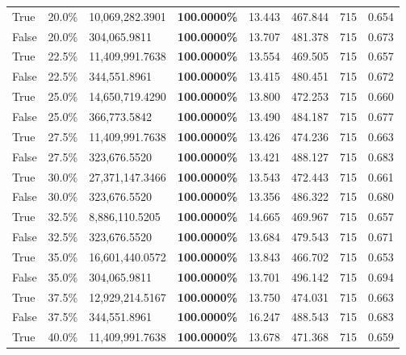 \begin{table}[H]
\begin{tabular}{lllrllll}
\cline{1-8}
True & 20.0\% & 10,069,282.3901 & \bfseries \color{red} 100.0000\% & 13.443 & 467.844 & 715 & 0.654 \\
\cline{1-8}
False & 20.0\% & \color{red} 304,065.9811 & \bfseries \color{red} 100.0000\% & 13.707 & 481.378 & 715 & 0.673 \\
\cline{1-8}
True & 22.5\% & 11,409,991.7638 & \bfseries \color{red} 100.0000\% & 13.554 & 469.505 & 715 & 0.657 \\
\cline{1-8}
False & 22.5\% & 344,551.8961 & \bfseries \color{red} 100.0000\% & 13.415 & 480.451 & 715 & 0.672 \\
\cline{1-8}
True & 25.0\% & 14,650,719.4290 & \bfseries \color{red} 100.0000\% & 13.800 & 472.253 & 715 & 0.660 \\
\cline{1-8}
False & 25.0\% & 366,773.5842 & \bfseries \color{red} 100.0000\% & 13.490 & 484.187 & 715 & 0.677 \\
\cline{1-8}
True & 27.5\% & 11,409,991.7638 & \bfseries \color{red} 100.0000\% & 13.426 & 474.236 & 715 & 0.663 \\
\cline{1-8}
False & 27.5\% & 323,676.5520 & \bfseries \color{red} 100.0000\% & 13.421 & 488.127 & 715 & 0.683 \\
\cline{1-8}
True & 30.0\% & 27,371,147.3466 & \bfseries \color{red} 100.0000\% & 13.543 & 472.443 & 715 & 0.661 \\
\cline{1-8}
False & 30.0\% & 323,676.5520 & \bfseries \color{red} 100.0000\% & 13.356 & 486.322 & 715 & 0.680 \\
\cline{1-8}
True & 32.5\% & 8,886,110.5205 & \bfseries \color{red} 100.0000\% & 14.665 & 469.967 & 715 & 0.657 \\
\cline{1-8}
False & 32.5\% & 323,676.5520 & \bfseries \color{red} 100.0000\% & 13.684 & 479.543 & 715 & 0.671 \\
\cline{1-8}
True & 35.0\% & 16,601,440.0572 & \bfseries \color{red} 100.0000\% & 13.843 & 466.702 & 715 & 0.653 \\
\cline{1-8}
False & 35.0\% & \color{red} 304,065.9811 & \bfseries \color{red} 100.0000\% & 13.701 & 496.142 & 715 & 0.694 \\
\cline{1-8}
True & 37.5\% & 12,929,214.5167 & \bfseries \color{red} 100.0000\% & 13.750 & 474.031 & 715 & 0.663 \\
\cline{1-8}
False & 37.5\% & 344,551.8961 & \bfseries \color{red} 100.0000\% & 16.247 & 488.543 & 715 & 0.683 \\
\cline{1-8}
True & 40.0\% & 11,409,991.7638 & \bfseries \color{red} 100.0000\% & 13.678 & 471.368 & 715 & 0.659 \\

\end{tabular}
\end{table}
